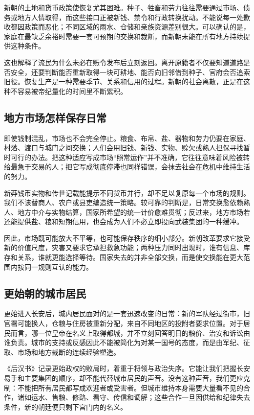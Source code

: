 新朝的土地和货币政策使恢复尤其困难。种子、牲畜和劳力往往需要通过市场、债务或地方人情取得，而这些接口正被新钱、禁令和行政转换扰动。不能说每一处歉收都因政策而恶化；不同区域的雨水、仓储和亲族资源差别很大。可以确认的是，家庭在最缺乏余裕时需要一套可预期的交换和裁断，而新朝未能在所有地方持续提供这种条件。

这也解释了流民为什么未必在赈令发布后立刻返回。离开原籍者不仅要知道道路是否安全，还要判断能否重新取得一块可耕地、能否向旧邻借到种子、官府会否追索旧役。恢复生产是一种需要季节、关系和信用的过程。新朝的社会离散，正是在这种不容易被帝纪量化的时间里不断累积。

\subsection{地方市场怎样保存日常}

即使钱制混乱，市场也不会完全停止。粮食、布帛、盐、器物和劳力仍要在家庭、村落、渡口与城门之间交换；人们会用旧钱、新钱、实物、赊欠或熟人担保寻找暂时可行的办法。把这种适应写成市场“照常运作”并不准确，它往往意味着风险被转给最急于交易的人；把它写成彻底停滞也同样错误，会抹去社会在危机中维持生活的努力。

新莽钱币实物和传世记载能提示不同货币并行，却不足以复原每一个市场的规则。我们不该替商人、农户或县吏编造统一策略。较可靠的判断是，日常交换愈依赖熟人、地方中介与实物结算，国家所希望的统一计价愈难贯彻；反过来，地方市场若还能提供盐、粮和短期信用，也会成为人们不必立即投向武装集团的一种缓冲。

因此，市场既可能放大不平等，也可能保存秩序的细小部分。新朝改革要求它接受新的价值尺度，灾害又要求它承担救急功能；两种压力同时出现时，谁有信息、库存和关系，谁就更能选择等待。国家失去的并非全部交换，而是使交换能在更大范围内按同一规则互认的能力。

\subsection{更始朝的城市居民}

更始进入长安后，城内居民面对的是一套迅速改变的日常：新的军队经过街市，旧官署可能换人，仓粮与住房被重新分配，来自不同地区的投附者要求位置。对于居民而言，哪一位皇帝在名义上取得都城，并不立刻回答明日的粮价、治安和诉讼由谁负责。城市的支持或反感因此不能被简化为对某一国号的态度，而是由军纪、征取、市场和地方裁断的连续经验塑造。

《后汉书》记录更始政权的败局时，着重于将领与政治失序。它能让我们把握长安易手和主要集团的顺序，却不能代替城市居民的声音。没有这种声音，我们更应克制：不能把所有居民都写成欢迎者或受害者。但城市维持本身需要大量看不见的合作，诸如运水、售粮、修路、看守、传信和调解；这些合作一旦因供给和纪律失去条件，新的朝廷便只剩下宫门内的名义。

